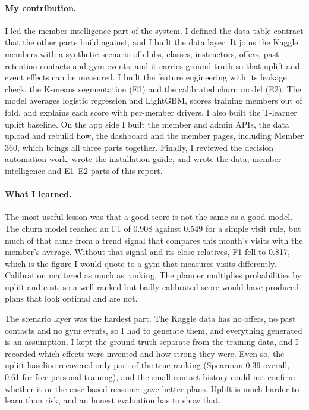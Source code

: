 \paragraph{My contribution.} I led the member intelligence part of the system. I defined the data-table contract that the other parts build against, and I built the data layer. It joins the Kaggle members with a synthetic scenario of clubs, classes, instructors, offers, past retention contacts and gym events, and it carries ground truth so that uplift and event effects can be measured. I built the feature engineering with its leakage check, the K-means segmentation (E1) and the calibrated churn model (E2). The model averages logistic regression and LightGBM, scores training members out of fold, and explains each score with per-member drivers. I also built the T-learner uplift baseline. On the app side I built the member and admin APIs, the data upload and rebuild flow, the dashboard and the member pages, including Member 360, which brings all three parts together. Finally, I reviewed the decision automation work, wrote the installation guide, and wrote the data, member intelligence and E1--E2 parts of this report.

\paragraph{What I learned.} The most useful lesson was that a good score is not the same as a good model. The churn model reached an F1 of 0.908 against 0.549 for a simple visit rule, but much of that came from a trend signal that compares this month's visits with the member's average. Without that signal and its close relatives, F1 fell to 0.817, which is the figure I would quote to a gym that measures visits differently. Calibration mattered as much as ranking. The planner multiplies probabilities by uplift and cost, so a well-ranked but badly calibrated score would have produced plans that look optimal and are not.

The scenario layer was the hardest part. The Kaggle data has no offers, no past contacts and no gym events, so I had to generate them, and everything generated is an assumption. I kept the ground truth separate from the training data, and I recorded which effects were invented and how strong they were. Even so, the uplift baseline recovered only part of the true ranking (Spearman 0.39 overall, 0.61 for free personal training), and the small contact history could not confirm whether it or the case-based reasoner gave better plans. Uplift is much harder to learn than risk, and an honest evaluation has to show that.

